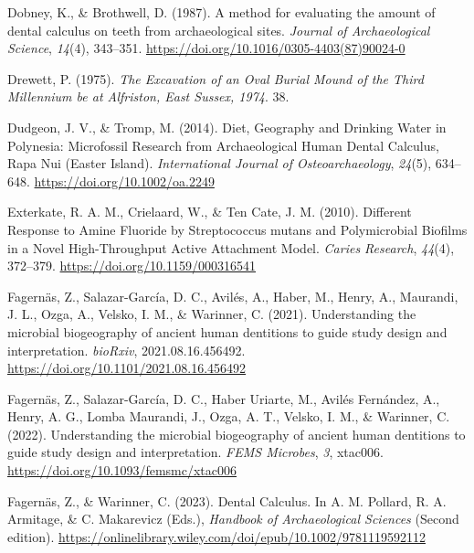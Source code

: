 \documentclass[
  letterpaper,
]{book}
\newlength{\cslhangindent}
\newlength{\cslentryspacingunit} %
\newenvironment{CSLReferences}[2] %
 {%
  \setlength{\parindent}{0pt}
  \ifodd #1
  \let\oldpar\par
  \def\par{\hangindent=\cslhangindent\oldpar}
  \fi
  \setlength{\parskip}{#2\cslentryspacingunit}
 }%
 {}
\begin{document}
\begin{CSLReferences}{1}{0}
\leavevmode{}%
Dobney, K., \& Brothwell, D. (1987). A method for evaluating the amount
of dental calculus on teeth from archaeological sites. \emph{Journal of
Archaeological Science}, \emph{14}(4), 343--351.
\url{https://doi.org/10.1016/0305-4403(87)90024-0}

\leavevmode{}%
Drewett, P. (1975). \emph{The {Excavation} of an {Oval Burial Mound} of
the {Third Millennium} be at {Alfriston}, {East Sussex}, 1974}. 38.

\leavevmode{}%
Dudgeon, J. V., \& Tromp, M. (2014). Diet, {Geography} and {Drinking
Water} in {Polynesia}: {Microfossil Research} from {Archaeological Human
Dental Calculus}, {Rapa Nui} ({Easter Island}). \emph{International
Journal of Osteoarchaeology}, \emph{24}(5), 634--648.
\url{https://doi.org/10.1002/oa.2249}

\leavevmode{}%
Exterkate, R. A. M., Crielaard, W., \& Ten Cate, J. M. (2010). Different
{Response} to {Amine Fluoride} by {Streptococcus} mutans and
{Polymicrobial Biofilms} in a {Novel High-Throughput Active Attachment
Model}. \emph{Caries Research}, \emph{44}(4), 372--379.
\url{https://doi.org/10.1159/000316541}

\leavevmode{}%
Fagernäs, Z., Salazar-García, D. C., Avilés, A., Haber, M., Henry, A.,
Maurandi, J. L., Ozga, A., Velsko, I. M., \& Warinner, C. (2021).
Understanding the microbial biogeography of ancient human dentitions to
guide study design and interpretation. \emph{bioRxiv},
2021.08.16.456492. \url{https://doi.org/10.1101/2021.08.16.456492}

\leavevmode{}%
Fagernäs, Z., Salazar-García, D. C., Haber Uriarte, M., Avilés
Fernández, A., Henry, A. G., Lomba Maurandi, J., Ozga, A. T., Velsko, I.
M., \& Warinner, C. (2022). Understanding the microbial biogeography of
ancient human dentitions to guide study design and interpretation.
\emph{FEMS Microbes}, \emph{3}, xtac006.
\url{https://doi.org/10.1093/femsmc/xtac006}

\leavevmode{}%
Fagernäs, Z., \& Warinner, C. (2023). Dental {Calculus}. In A. M.
Pollard, R. A. Armitage, \& C. Makarevicz (Eds.), \emph{Handbook of
{Archaeological Sciences}} (Second edition).
\url{https://onlinelibrary.wiley.com/doi/epub/10.1002/9781119592112}


\end{CSLReferences}
\end{document}
